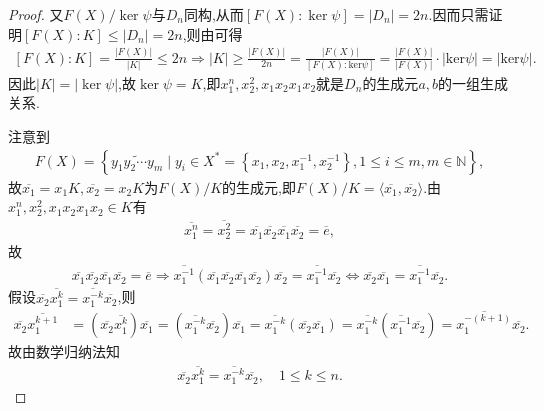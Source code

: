 \documentclass[../../main.tex]{subfiles}%
\begin{document}
\begin{proof}
又$F(X)/\ker\psi$与$D_n$同构,从而$[F(X):\ker\psi]=|D_n|=2n$.因而只需证明$[F(X):K]\leqslant |D_n|=2n$,则由可得
\begin{align*}
\left[ F\left( X \right) :K \right] =\frac{\left| F\left( X \right) \right|}{\left| K \right|}\leqslant 2n\Longrightarrow \left| K \right|\geqslant \frac{\left| F\left( X \right) \right|}{2n}=\frac{\left| F\left( X \right) \right|}{\left[ F\left( X \right) :\mathrm{ker}\psi \right]}=\frac{\left| F\left( X \right) \right|}{\left| F\left( X \right) \right|}\cdot \left| \mathrm{ker}\psi \right|=\left| \mathrm{ker}\psi \right|.
\end{align*}
因此$|K|=|\ker\psi|$,故$\ker\psi=K$,即$x_1^n,x_2^2,x_1x_2x_1x_2$就是$D_n$的生成元$a,b$的一组生成关系. 

注意到
\begin{align*}
F\left( X \right) =\left\{ \widetilde{y_1y_2\cdots y_m}\mid y_i\in X^*=\left\{ x_1,x_2,x_{1}^{-1},x_{2}^{-1} \right\} ,1\leqslant i\leqslant m,m\in \mathbb{N} \right\} ,
\end{align*}
故$\overline{x_1}=x_1K,\overline{x_2}=x_2K$为$F(X)/K$的生成元,即$F(X)/K=\langle \overline{x_1},\overline{x_2}\rangle$.由$x_1^n,x_2^2,x_1x_2x_1x_2\in K$有
\begin{align*}
\overline{x_1^n}=\overline{x_2^2}=\overline{x_1}\overline{x_2}\overline{x_1}\overline{x_2}=\overline{e},
\end{align*}
故
\begin{align*}
\overline{x_1}\overline{x_2}\overline{x_1}\overline{x_2}=\overline{e}\Longrightarrow \overline{x_{1}^{-1}}\left( \overline{x_1}\overline{x_2}\overline{x_1}\overline{x_2} \right) \overline{x_2}=\overline{x_{1}^{-1}}\overline{x_2}\Longleftrightarrow \overline{x_2}\overline{x_1}=\overline{x_{1}^{-1}}\overline{x_2}.
\end{align*}
假设$\overline{x_2}\overline{x_{1}^{k}}=\overline{x_{1}^{-k}}\overline{x_2}$,则
\begin{align*}
\overline{x_2}\overline{x_{1}^{k+1}}&=\left( \overline{x_2}\overline{x_{1}^{k}} \right) \overline{x_1}=\left( \overline{x_{1}^{-k}}\overline{x_2} \right) \overline{x_1}=\overline{x_{1}^{-k}}\left( \overline{x_2}\overline{x_1} \right) =\overline{x_{1}^{-k}}\left( \overline{x_{1}^{-1}}\overline{x_2} \right) =\overline{x_{1}^{-\left( k+1 \right)}}\overline{x_2}.
\end{align*}
故由数学归纳法知
\begin{align*}
\overline{x_2}\overline{x_{1}^{k}}=\overline{x_{1}^{-k}}\overline{x_2},\quad 1\leqslant k\leqslant n.

\end{align*}
\end{proof}
\end{document}
